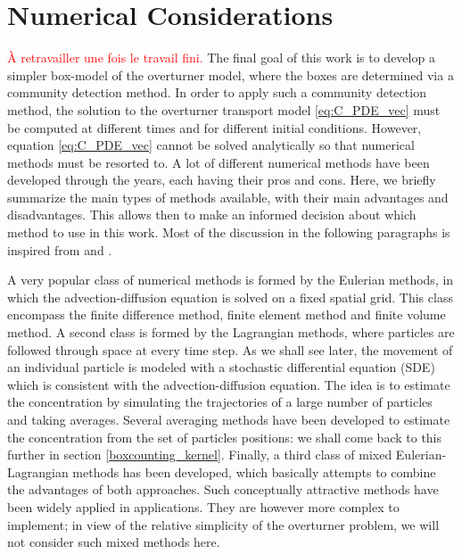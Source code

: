 \chapter{Numerical Considerations} \label{chap:numerical}
\textcolor{red}{À retravailler une fois le travail fini.}
The final goal of this work is to develop a simpler box-model of the overturner model, where the boxes are determined via a community detection method. In order to apply such a community detection method, the solution to the overturner transport model \eqref{eq:C_PDE_vec} must be computed at different times and for different initial conditions. However, equation \eqref{eq:C_PDE_vec} cannot be solved analytically so that numerical methods must be resorted to. A lot of different numerical methods have been developed through the years, each having their pros and cons. Here, we briefly summarize the main types of methods available, with their main advantages and disadvantages. This allows then to make an informed decision about which method to use in this work. Most of the discussion in the following paragraphs is inspired from \cite{spivakovskaya2007lagrangian} and \cite{spivakovskaya2007backward}. 

A very popular class of numerical methods is formed by the Eulerian methods, in which the advection-diffusion equation is solved on a fixed spatial grid. This class encompass the finite difference method, finite element method and finite volume method. A second class is formed by the Lagrangian methods, where particles are followed through space at every time step. As we shall see later, the movement of an individual particle is modeled with a stochastic differential equation (SDE) which is consistent with the advection-diffusion equation. The idea is to estimate the concentration by simulating the trajectories of a large number of particles and taking averages. Several averaging methods have been developed to estimate the concentration from the set of particles positions: we shall come back to this further in section \ref{boxcounting_kernel}. Finally, a third class of mixed Eulerian-Lagrangian methods has been developed, which basically attempts to combine the advantages of both approaches. Such conceptually attractive methods have been widely applied in applications. They are however more complex to implement; in view of the relative simplicity of the overturner problem, we will not consider such mixed methods here.

